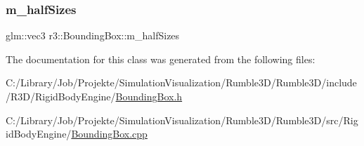 \subsubsection{\texorpdfstring{m\+\_\+half\+Sizes}{m\_halfSizes}}
{\footnotesize\ttfamily glm\+::vec3 r3\+::\+Bounding\+Box\+::m\+\_\+half\+Sizes\hspace{0.3cm}{\ttfamily [protected]}}



The documentation for this class was generated from the following files\+:\begin{DoxyCompactItemize}
\item 
C\+:/\+Library/\+Job/\+Projekte/\+Simulation\+Visualization/\+Rumble3\+D/\+Rumble3\+D/include/\+R3\+D/\+Rigid\+Body\+Engine/\mbox{\hyperlink{_bounding_box_8h}{Bounding\+Box.\+h}}\item 
C\+:/\+Library/\+Job/\+Projekte/\+Simulation\+Visualization/\+Rumble3\+D/\+Rumble3\+D/src/\+Rigid\+Body\+Engine/\mbox{\hyperlink{_bounding_box_8cpp}{Bounding\+Box.\+cpp}}\end{DoxyCompactItemize}
